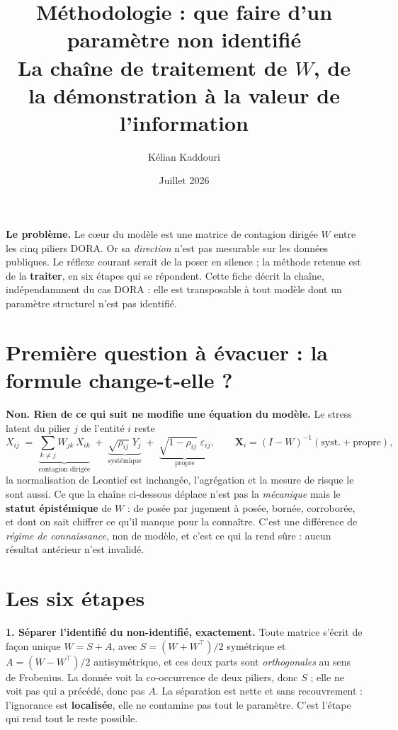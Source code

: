 \documentclass[11pt,a4paper]{article}
\title{\vspace{-1.2cm}\color{navy}\bfseries Méthodologie : que faire d'un paramètre
non identifié\\[2pt]
  \large La chaîne de traitement de $W$, de la démonstration à la valeur de l'information}
\author{Kélian Kaddouri}
\date{Juillet 2026}
\begin{document}
\maketitle
\vspace{-0.8cm}

\begin{cle}
\textbf{Le problème.} Le c\oe ur du modèle est une matrice de contagion dirigée $W$ entre les
cinq piliers DORA. Or sa \emph{direction} n'est pas mesurable sur les données publiques. Le
réflexe courant serait de la poser en silence ; la méthode retenue est de la \textbf{traiter}, en
six étapes qui se répondent. Cette fiche décrit la chaîne, indépendamment du cas DORA : elle est
transposable à tout modèle dont un paramètre structurel n'est pas identifié.
\end{cle}

\section*{Première question à évacuer : la formule change-t-elle ?}

\textbf{Non. Rien de ce qui suit ne modifie une équation du modèle.} Le stress latent du pilier
$j$ de l'entité $i$ reste
\[
X_{ij} \;=\; \underbrace{\textstyle\sum_{k\neq j} W_{jk}\,X_{ik}}_{\text{contagion dirigée}}
   \;+\; \underbrace{\sqrt{\rho_{ij}}\;Y_j}_{\text{systémique}}
   \;+\; \underbrace{\sqrt{1-\rho_{ij}}\;\varepsilon_{ij}}_{\text{propre}} ,
\qquad
\mathbf{X}_i = (I-W)^{-1}(\text{syst.} + \text{propre}),
\]
la normalisation de Leontief est inchangée, l'agrégation et la mesure de risque le sont aussi.
Ce que la chaîne ci-dessous déplace n'est pas la \emph{mécanique} mais le \textbf{statut
épistémique} de $W$ : de \og{}posée par jugement\fg{} à \og{}posée, bornée, corroborée, et dont
on sait chiffrer ce qu'il manque pour la connaître\fg{}. C'est une différence de \emph{régime de
connaissance}, non de modèle, et c'est ce qui la rend sûre : aucun résultat antérieur n'est
invalidé.

\section*{Les six étapes}

\textbf{1. Séparer l'identifié du non-identifié, exactement.} Toute matrice s'écrit de façon
unique $W = S + A$, avec $S=(W+W^\top)/2$ symétrique et $A=(W-W^\top)/2$ antisymétrique, et ces
deux parts sont \emph{orthogonales} au sens de Frobenius. La donnée voit la co-occurrence de deux
piliers, donc $S$ ; elle ne voit pas qui a précédé, donc pas $A$. La séparation est nette et sans
recouvrement : l'ignorance est \textbf{localisée}, elle ne contamine pas tout le paramètre. C'est
l'étape qui rend tout le reste possible.
\end{document}
